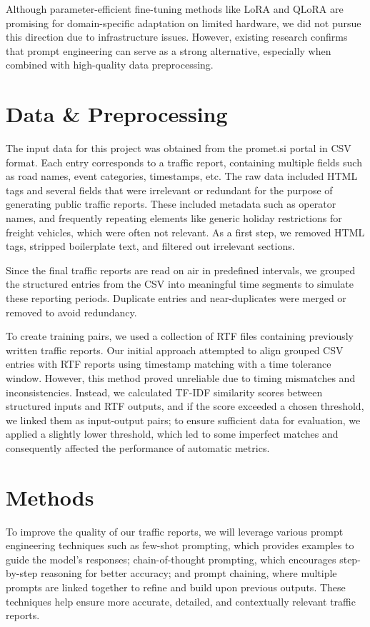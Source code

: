 \documentclass[fleqn,moreauthors,10pt]{ds_report}
\begin{document}
Although parameter-efficient fine-tuning methods like LoRA \cite{lowrandadaptation} and QLoRA \cite{qlora} are promising for domain-specific adaptation on limited hardware, we did not pursue this direction due to infrastructure issues. However, existing research confirms that prompt engineering can serve as a strong alternative, especially when combined with high-quality data preprocessing.

\section*{Data \& Preprocessing}

The input data for this project was obtained from the promet.si portal in CSV format. Each entry corresponds to a traffic report, containing multiple fields such as road names, event categories, timestamps, etc. The raw data included HTML tags and several fields that were irrelevant or redundant for the purpose of generating public traffic reports. These included metadata such as operator names, and frequently repeating elements like generic holiday restrictions for freight vehicles, which were often not relevant. As a first step, we removed HTML tags, stripped boilerplate text, and filtered out irrelevant sections.\newline

Since the final traffic reports are read on air in predefined intervals, we grouped the structured entries from the CSV into meaningful time segments to simulate these reporting periods. Duplicate entries and near-duplicates were merged or removed to avoid redundancy.\newline

To create training pairs, we used a collection of RTF files containing previously written traffic reports. Our initial approach attempted to align grouped CSV entries with RTF reports using timestamp matching with a time tolerance window. However, this method proved unreliable due to timing mismatches and inconsistencies. Instead, we calculated TF-IDF similarity scores between structured inputs and RTF outputs, and if the score exceeded a chosen threshold, we linked them as input-output pairs; to ensure sufficient data for evaluation, we applied a slightly lower threshold, which led to some imperfect matches and consequently affected the performance of automatic metrics.

\section*{Methods}
To improve the quality of our traffic reports, we will leverage various prompt engineering techniques such as few-shot prompting, which provides examples to guide the model’s responses; chain-of-thought prompting, which encourages step-by-step reasoning for better accuracy; and prompt chaining, where multiple prompts are linked together to refine and build upon previous outputs.
These techniques help ensure more accurate, detailed, and contextually relevant traffic reports.
\end{document}
